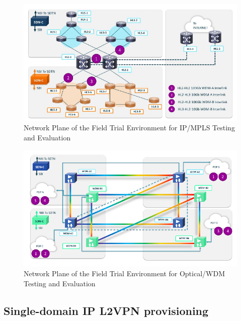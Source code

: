 \documentclass[a4paper,fleqn]{cas-dc}
\begin{document}

\begin{figure}
	\centering
		\includegraphics[scale=1]{figs/field_trial_environment_ip.pdf}
	\caption{Network Plane of the Field Trial Environment for IP/MPLS Testing and Evaluation}
	\label{FIG:field_trial_ip}
\end{figure}

\begin{figure}
	\centering
		\includegraphics[scale=1]{figs/field_trial_environment_optical.pdf}
	\caption{Network Plane of the Field Trial Environment for Optical/WDM Testing and Evaluation}
	\label{FIG:field_trial_optical}
\end{figure}

\subsection{Single-domain IP L2VPN provisioning}
\label{section:single-l2nm}
\end{document}
